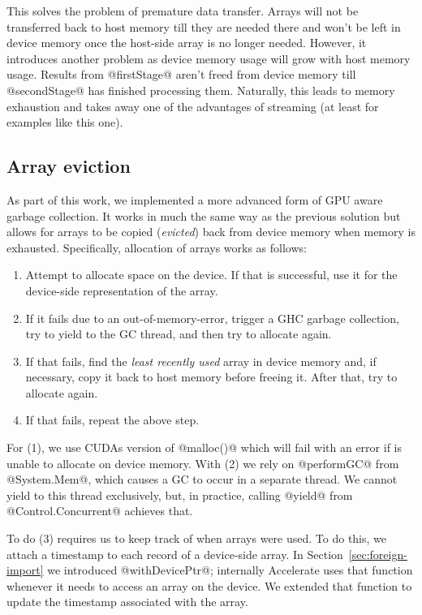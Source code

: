 This solves the problem of premature data transfer. Arrays will not be transferred back to host memory till they are needed there and won't be left in device memory once the host-side array is no longer needed. However, it introduces another problem as device memory usage will grow with host memory usage. Results from @firstStage@ aren't freed from device memory till @secondStage@ has finished processing them. Naturally, this leads to memory exhaustion and takes away one of the advantages of streaming (at least for examples like this one).

\subsection{Array eviction}

As part of this work, we implemented a more advanced form of GPU aware garbage collection. It works in much the same way as the previous solution but allows for arrays to be copied (\emph{evicted}) back from device memory when memory is exhausted. Specifically, allocation of arrays works as follows:
%
\begin{enumerate}
\item Attempt to allocate space on the device. If that is successful, use it for the device-side representation of the array.
\item If it fails due to an out-of-memory-error, trigger a GHC garbage collection, try to yield to the GC thread, and then try to allocate again.
\item If that fails, find the \emph{least recently used} array in device memory and, if necessary, copy it back to host memory before freeing it. After that, try to allocate again.
\item If that fails, repeat the above step.
\end{enumerate}
%
For (1), we use CUDAs version of @malloc()@ which will fail with an error if is unable to allocate on device memory. With (2) we rely on @performGC@ from @System.Mem@, which causes a GC to occur in a separate thread. We cannot yield to this thread exclusively, but, in practice, calling @yield@ from @Control.Concurrent@ achieves that.

To do (3) requires us to keep track of when arrays were used. To do this, we attach a timestamp to each record of a device-side array. In Section~\ref{sec:foreign-import} we introduced @withDevicePtr@; internally Accelerate uses that function whenever it needs to access an array on the device. We extended that function to update the timestamp associated with the array.

